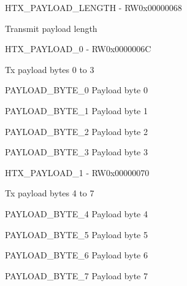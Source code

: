 \documentclass{article}
\begin{document}
\begin{register}{H}{TX{\_}PAYLOAD{\_}LENGTH - RW}{0x00000068}  \par Transmit payload length \regnewline
  \label{TX_PAYLOAD_LENGTH}
\regnewline
\end{register}

\begin{register}{H}{TX{\_}PAYLOAD{\_}0 - RW}{0x0000006C}  \par Tx payload bytes 0 to 3 \regnewline
  \label{TX_PAYLOAD_0}
\regnewline
  \begin{regdesc}\begin{reglist}
    \item [PAYLOAD{\_}BYTE{\_}0] Payload byte 0    \item [PAYLOAD{\_}BYTE{\_}1] Payload byte 1    \item [PAYLOAD{\_}BYTE{\_}2] Payload byte 2    \item [PAYLOAD{\_}BYTE{\_}3] Payload byte 3  \end{reglist}\end{regdesc}
\end{register}

\begin{register}{H}{TX{\_}PAYLOAD{\_}1 - RW}{0x00000070}  \par Tx payload bytes 4 to 7 \regnewline
  \label{TX_PAYLOAD_1}
\regnewline
  \begin{regdesc}\begin{reglist}
    \item [PAYLOAD{\_}BYTE{\_}4] Payload byte 4    \item [PAYLOAD{\_}BYTE{\_}5] Payload byte 5    \item [PAYLOAD{\_}BYTE{\_}6] Payload byte 6    \item [PAYLOAD{\_}BYTE{\_}7] Payload byte 7  \end{reglist}\end{regdesc}
\end{register}
\end{document}
